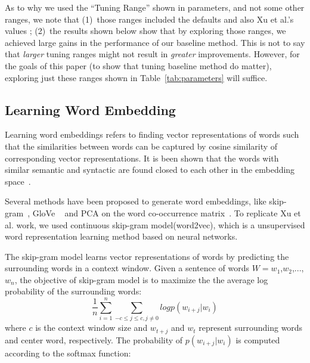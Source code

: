\documentclass[sigconf,review, anonymous]{acmart}
\theoremstyle{break}
\newcommand{\tab}[1]{Table~\ref{tab:#1}}
\begin{document}
As to why we used the ``Tuning Range'' shown in {parameters}, and not some other ranges,
we note that (1)~those ranges included the defaults and also Xu et al.'s values ; (2)~the results shown below
show that by exploring those ranges,  we achieved large gains in the performance of our baseline method.
This is not to say that {\em larger} tuning ranges might not result in {\em greater} improvements.
However, for the goals of this paper (to show that tuning baseline method do matter), exploring
just these ranges shown in \tab{parameters} will suffice.




\subsection{Learning Word Embedding}
Learning word embeddings refers to finding vector representations
of words such that the similarities between words can be captured by cosine similarity of corresponding 
vector representations. It is been shown that the words with similar semantic and syntactic are found closed
to each other in the embedding space~\cite{mikolov2013distributed}.

Several methods have been proposed to generate word embeddings, 
like skip-gram~\cite{mikolov2013distributed}, GloVe ~\cite{pennington2014glove}
and PCA on the word co-occurrence matrix~\cite{lebret2013word}. To replicate Xu et al. work,
we used continuous skip-gram model(word2vec),  which is a unsupervised word representation learning method based on
neural networks. 

The skip-gram model learns vector representations of words
 by predicting the surrounding words in a context window. 
 Given a sentence of words $W =w_1$,$w_2$,...,$w_n$, the objective of skip-gram model is to maximize the
 the average log probability of the surrounding words:
 \begin{equation*}
 \frac{1}{n}\sum_{i=1}^{n} \sum_{-c\leq j \leq c, j \neq 0} log p(w_{i+j}|w_i)
\end{equation*}
where $c$ is the context window size and $w_{t+j}$ and $w_{t}$ represent surrounding words and center word, respectively.
The probability of $p(w_{i+j}|w_i)$ is computed according to the softmax function:
\end{document}
